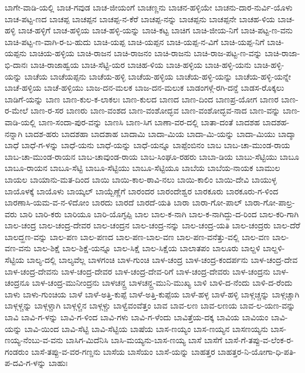 ಬಾಗೇ-ವಾಡಿ-ಯಲ್ಲಿ
ಬಾಚ-ಗವುಡ
ಬಾಚ-ಜೀಯಂಗೆ
ಬಾಚಣ್ಣನು
ಬಾಚನ-ಹಳ್ಳಿಯೇ
ಬಾಚನು-ದಾರ-ನುರ್ವಿ-ಯೊಳು
ಬಾಚ-ಪಟ್ಟ-ಣದ
ಬಾಚಪ್ಪ
ಬಾಚಪ್ಪನ
ಬಾಚಪ್ಪ-ನ-ಕೆರೆ
ಬಾಚಪ್ಪ-ನನ್ನು
ಬಾಚಪ್ಪನು
ಬಾಚಪ್ಪನೇ
ಬಾಚಹ-ಳಿಯ
ಬಾಚ-ಹಳ್ಳಿ
ಬಾಚ-ಹಳ್ಳಿಗೆ
ಬಾಚ-ಹಳ್ಳಿಯ
ಬಾಚ-ಹಳ್ಳಿ-ಯನ್ನು
ಬಾಚಿ-ಕಟ್ಟ
ಬಾಚಿಗ
ಬಾಚಿ-ಜೀಯ-ನಿಗೆ
ಬಾಚಿ-ಪಟ್ಟ-ಣ-ವನು
ಬಾಚಿ-ಪಟ್ಟ-ಣ-ವಾಗಿ-ರ-ಬ-ಹುದು
ಬಾಚಿ-ಯಪ್ಪ
ಬಾಚಿ-ಯಪ್ಪನ
ಬಾಚಿ-ಯಪ್ಪ-ನ-ವಿಗೆ
ಬಾಚಿ-ಯಪ್ಪ-ನಿಗೆ
ಬಾಚಿ-ಯಪ್ಪನು
ಬಾಚಿಯ-ಹಳ್ಳಿಯ
ಬಾಚಿ-ರಾಜನ
ಬಾಚಿ-ರಾಜನಂ
ಬಾಚಿ-ರಾಜನು
ಬಾಚಿ-ರಾಜ-ಪಟ್ಟ-ಣ-ವನ್ನು
ಬಾಚಿ-ರಾಜಾ-ಭಿ-ದಾನಃ
ಬಾಚಿ-ರಾಜಾಹ್ವಯ
ಬಾಚಿ-ಸೆಟ್ಟಿ-ಯರ
ಬಾಚಿಹ-ಳಿಯ
ಬಾಚಿ-ಹಳ್ಳಿಯ
ಬಾಚಿ-ಹಳ್ಳಿ-ಯನು
ಬಾಚಿ-ಹಳ್ಳಿ-ಯನ್ನು
ಬಾಚೆಯ
ಬಾಚೆಯಪ್ಪನು
ಬಾಚೆಯ-ಹಳ್ಳಿ
ಬಾಚೆಯ-ಹಳ್ಳಿಯ
ಬಾಚೆಯ-ಹಳ್ಳಿ-ಯನ್ನು
ಬಾಚೆಯ-ಹಳ್ಳಿ-ಯನ್ನೇ
ಬಾಚೆ-ಹಳ್ಳಿಯ
ಬಾಚೆ-ಹಳ್ಳಿಯು
ಬಾಜ-ದನ-ಮಲಕ
ಬಾಜ-ದನ-ಮಲುಕ
ಬಾಡಂಗಳ್ಗೆ-ರಗಿ-ದನ್ದೆ
ಬಾಡಸ-ರೊಕ್ಕಲು
ಬಾಡಿಗೆ-ಯನ್ನು
ಬಾಣ
ಬಾಣ-ಕುಲ-ಕ-ಲಾಕಲಃ
ಬಾಣ-ಕುಲದ
ಬಾಣದ
ಬಾಣ-ದಿಂದ
ಬಾಣಪ್ರ-ಯೋಗ
ಬಾಣರ
ಬಾಣ-ರ-ಮೇಲೆ
ಬಾಣ-ರ-ಸರ
ಬಾಣರು
ಬಾಣ-ವಂಶದ
ಬಾಣ-ವಂಶೋದ್ಭವ
ಬಾಣ-ವಂಶೋದ್ಭವ-ನಾದ
ಬಾಣ-ವನ್ನು
ಬಾಣ-ವಾಡಿ-ಯಲ್ಲಿ
ಬಾಣ-ಸಂದಾ-ಪುರ-ವನ್ನು
ಬಾಣಸಿ
ಬಾಣ-ಸಿಗ
ಬಾಣಾ-ವರ-ದಲ್ಲಿ
ಬಾತಾ-ದಂತೆ
ಬಾದಶಹ
ಬಾದಶಹ-ನನ್ನಾಗಿ
ಬಾದಶ-ಹರು
ಬಾದಶಹಾ
ಬಾದಶಾಹ
ಬಾದಾಮಿ
ಬಾದಾ-ಮಿಯ
ಬಾದಾ-ಮಿ-ಯನ್ನು
ಬಾದಾ-ಮಿಯು
ಬಾದ್ಶಾ
ಬಾಧೆ
ಬಾಧೆ-ಗ-ಳನ್ನು
ಬಾಧೆ-ಯನು
ಬಾಧೆ-ಯನ್ನು
ಬಾಧೆ-ಯನ್ನೂ
ಬಾಪ್ಪೆಂಬಿನಂ
ಬಾಬ
ಬಾಬ-ಚಾ-ಮುಂಡ-ರಾಯ
ಬಾಬ-ಚಾ-ಮುಂಡ-ರಾಯನ
ಬಾಬ-ಚಾವುಂಡ-ರಾಯ
ಬಾಬ-ಸಿಂಘೂ-ರಹರು
ಬಾಬಾ-ಡಿಯ
ಬಾಬು-ಸೆಟ್ಟಿಯು
ಬಾಬೂ
ಬಾಬೂ-ರಾಯನ
ಬಾಬೂ-ಸೆಟ್ಟಿ
ಬಾಬೂ-ಸೆಟ್ಟಿಯು
ಬಾಬೂ-ಸೆಟ್ಟಿಯೂ
ಬಾಬೆಯ
ಬಾಬೆಯ-ನಾಯಕ
ಬಾಮುಲ
ಬಾಯಲ
ಬಾಯಾನು-ಮತ-ದಿಂದ
ಬಾಯಿ
ಬಾಯಿ-ಕಾಲ-ಠಾವಿ-ನಲು
ಬಾಯಿ-ಕಾಲಿಂ
ಬಾಯಿ-ದೇವಿ
ಬಾಯುಳ್ಳ
ಬಾಯೊಳಕ್ಕೆ
ಬಾಯೊಳು
ಬಾಯ್ಕಲ್
ಬಾಯ್ಬೆಣ್ಣೆಗೆ
ಬಾರಂದರ
ಬಾರಂದೇಶ್ವರ
ಬಾರಕೂರು
ಬಾರಕೂರು-ಗ-ಳಿಂದ
ಬಾರಣಾಸಿ-ಯಮ-ವ-ನ-ಳಿದೋಂ
ಬಾರದು
ಬಾರದೆ
ಬಾರದೆ-ಯತಿ
ಬಾರಾ
ಬಾರಾ-ಗೋ-ಪಾಲ್
ಬಾರಾ-ಗೋ-ಪಾಲ್ರ-ವರು
ಬಾರಿ
ಬಾರಿ-ಕರು
ಬಾರಿಯೂ
ಬಾರಿ-ಯೊಗ್ಳಪ್ಪಿ
ಬಾಲ
ಬಾಲ-ಕ-ನಾಗಿ
ಬಾಲ-ಕ-ನಾಗಿದ್ದು-ದ-ರಿಂದ
ಬಾಲ-ಕರಿ-ಗಾಗಿ
ಬಾಲ-ಚಂದ್ರ
ಬಾಲ-ಚಂದ್ರ-ದೇವರ
ಬಾಲ-ಚಂದ್ರನ
ಬಾಲ-ಚಂದ್ರ-ನನ್ನು
ಬಾಲ-ಚಂದ್ರ-ಯತಿ
ಬಾಲ-ಚಂದ್ರರು
ಬಾಲ-ದೆರೆ
ಬಾಲದ್ಹಣ-ವನ್ನು
ಬಾಲ-ಪಣ
ಬಾಲ-ಪಣದ
ಬಾಲ-ಪಣ-ಬಾಲ-ವಣ
ಬಾಲ-ಪಣ-ವನೆತ್ತು-ವಲ್ಲಿ
ಬಾಲ-ವಣ
ಬಾಲ-ವಣ-ವನು
ಬಾಲ-ಶಿಕ್ಷೆ
ಬಾಲ-ಶಿಕ್ಷೆ-ಯನ್ನೂ
ಬಾಲ-ಸಿಕ್ಷೆ
ಬಾಲ-ಸಿಕ್ಷೆಯ
ಬಾಲಾತಪಂ
ಬಾಲೂರು
ಬಾಲ್ದಳಿ
ಬಾಲ್ದಳಿ-ಸೆಟ್ಟಿಯ
ಬಾಲ್ಯ-ದಲ್ಲಿ
ಬಾಲ್ಯವೆಲ್ಲ
ಬಾಳಗಂಚಿ
ಬಾಳ-ಗುಂಚಿ
ಬಾಳ-ಚಂದ್ರ
ಬಾಳ-ಚಂದ್ರ-ಕಂದರ್ಪನು
ಬಾಳ-ಚಂದ್ರ-ದೇವ
ಬಾಳ-ಚಂದ್ರ-ದೇವನು
ಬಾಳ-ಚಂದ್ರ-ದೇವರ
ಬಾಳ-ಚಂದ್ರ-ದೇವ-ರಿಗೆ
ಬಾಳ-ಚಂದ್ರ-ದೇವರು
ಬಾಳ-ಚಂದ್ರನು
ಬಾಳ-ಚಂದ್ರನೂ
ಬಾಳ-ಚಂದ್ರ-ಮುನೀಂದ್ರನು
ಬಾಳಚನ್ದ್ರ
ಬಾಳಚನ್ದ್ರ-ಮುನಿ-ಮುಖ್ಯ
ಬಾಳಿ
ಬಾಳಿ-ದ-ನೆಂದು
ಬಾಳಿ-ದ-ರೆಂದು
ಬಾಳು
ಬಾಳು-ಗುಂಚಿಯ
ಬಾಳೆ
ಬಾಳೆ-ಅತ್ತಿ-ಕುಪ್ಪೆ
ಬಾಳೆ-ಅತ್ತಿ-ಕುಪ್ಪೆಯ
ಬಾಳೆ-ಹಳ್ಳ
ಬಾಳೆ-ಹಳ್ಳಿ
ಬಾಳ್ಗಚ್ಚನ್ನು
ಬಾಳ್ಗಚ್ಚಾಗಿ
ಬಾಳ್ಗಳ್ಚನ್ನು
ಬಾಳ್ಗಳ್ಚಾಗಿ
ಬಾಳ್ಗಳ್ಚಿನ
ಬಾಳ್ಗಳ್ಚು
ಬಾಳ್ವೆವಂವೆತ್ತಂ
ಬಾವ
ಬಾವ-ಲಣ
ಬಾವ-ಲಣಯ
ಬಾವ-ಲ-ಯಣ-ವನ್ನು
ಬಾವಿ
ಬಾವಿ-ಗ-ಳನ್ನು
ಬಾವಿ-ಗ-ಳಿಂದ
ಬಾವಿ-ಗಳು
ಬಾವಿ-ಗ-ಳೆಂದು
ಬಾವಿತ್ತೆಯ-ದಕ್ಕ
ಬಾವಿಯ
ಬಾವಿಯಂ
ಬಾವಿ-ಯನ್ನು
ಬಾವಿ-ಯಿಂದ
ಬಾವಿ-ಸೆಟ್ಟಿ
ಬಾವಿ-ಸೆಟ್ಟಿಯ
ಬಾಷೆಯ
ಬಾಸ-ಣಯ್ಯಂ
ಬಾಸ-ಣಯ್ಯನ
ಬಾಸಣಯ್ಯನು
ಬಾಸ-ಣಯ್ಯ-ನೆಂಬು-ವ-ವನು
ಬಾಸಿಗ-ಮಿದೆನಿಸಿ
ಬಾಸಿ-ಮಯ್ಯನು-ಬಾಸ-ಣಯ್ಯ
ಬಾಸೆ
ಬಾಸೆಗೆ
ಬಾಸೆ-ಗೆ-ತಪ್ಪು-ವ-ಲೆಂಕ-ರ-ಗಂಡರುಂ
ಬಾಸೆ-ತಪ್ಪು-ವ-ವರ-ಗಣ್ಡನು
ಬಾಸೆಯ
ಬಾಸೆಯಂ
ಬಾಸೆ-ಯನ್ನು
ಬಾಹತ್ತರ
ಬಾಹತ್ತರ-ನಿ-ಯೋಗಾ-ಧಿ-ಪತಿ-ಪ-ದವಿ-ಗ-ಳನ್ನು
ಬಾಹುಃ
